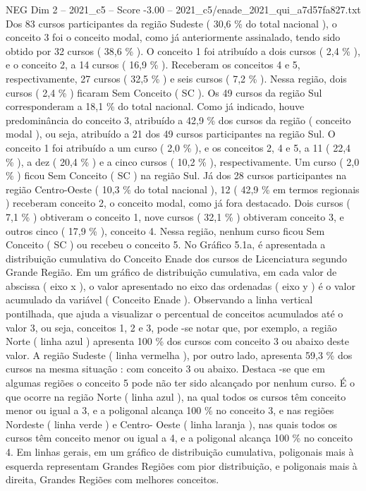 \begin{textsample}{NEG Dim 2 – 2021\_c5 – Score -3.00 – 2021\_c5/enade\_2021\_qui\_a7d57fa827.txt}
Dos 83 cursos participantes da região Sudeste ( 30,6 \% do total nacional ), o conceito 3 foi o conceito modal, como já anteriormente assinalado, tendo sido obtido por 32 cursos ( 38,6 \% ).
O conceito 1 foi atribuído a dois cursos ( 2,4 \% ), e o conceito 2, a 14 cursos ( 16,9 \% ).
Receberam os conceitos 4 e 5, respectivamente, 27 cursos ( 32,5 \% ) e seis cursos ( 7,2 \% ).
Nessa região, dois cursos ( 2,4 \% ) ficaram Sem Conceito ( SC ).
Os 49 cursos da região Sul corresponderam a 18,1 \% do total nacional.
Como já indicado, houve predominância do conceito 3, atribuído a 42,9 \% dos cursos da região ( conceito modal ), ou seja, atribuído a 21 dos 49 cursos participantes na região Sul.
O conceito 1 foi atribuído a um curso ( 2,0 \% ), e os conceitos 2, 4 e 5, a 11 ( 22,4 \% ), a dez ( 20,4 \% ) e a cinco cursos ( 10,2 \% ), respectivamente.
Um curso ( 2,0 \% ) ficou Sem Conceito ( SC ) na região Sul.
Já dos 28 cursos participantes na região Centro-Oeste ( 10,3 \% do total nacional ), 12 ( 42,9 \% em termos regionais ) receberam conceito 2, o conceito modal, como já fora destacado.
Dois cursos ( 7,1 \% ) obtiveram o conceito 1, nove cursos ( 32,1 \% ) obtiveram conceito 3, e outros cinco ( 17,9 \% ), conceito 4.
Nessa região, nenhum curso ficou Sem Conceito ( SC ) ou recebeu o conceito 5.
No Gráfico 5.1a, é apresentada a distribuição cumulativa do Conceito Enade dos cursos de Licenciatura segundo Grande Região.
Em um gráfico de distribuição cumulativa, em cada valor de abscissa ( eixo x ), o valor apresentado no eixo das ordenadas ( eixo y ) é o valor acumulado da variável ( Conceito Enade ).
Observando a linha vertical pontilhada, que ajuda a visualizar o percentual de conceitos acumulados até o valor 3, ou seja, conceitos 1, 2 e 3, pode -se notar que, por exemplo, a região Norte ( linha azul ) apresenta 100 \% dos cursos com conceito 3 ou abaixo deste valor.
A região Sudeste ( linha vermelha ), por outro lado, apresenta 59,3 \% dos cursos na mesma situação : com conceito 3 ou abaixo.
Destaca -se que em algumas regiões o conceito 5 pode não ter sido alcançado por nenhum curso.
É o que ocorre na região Norte ( linha azul ), na qual todos os cursos têm conceito menor ou igual a 3, e a poligonal alcança 100 \% no conceito 3, e nas regiões Nordeste ( linha verde ) e Centro- Oeste ( linha laranja ), nas quais todos os cursos têm conceito menor ou igual a 4, e a poligonal alcança 100 \% no conceito 4.
Em linhas gerais, em um gráfico de distribuição cumulativa, poligonais mais à esquerda representam Grandes Regiões com pior distribuição, e poligonais mais à direita, Grandes Regiões com melhores conceitos.

\end{textsample}
